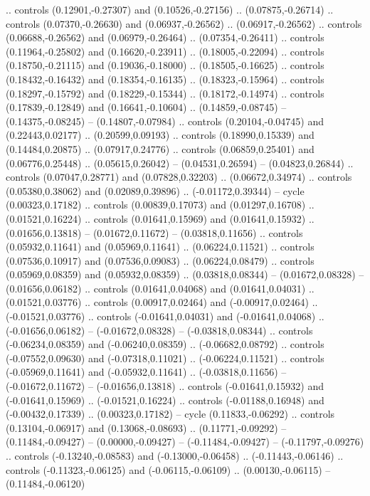 {{.. controls (0.12901,-0.27307) and (0.10526,-0.27156) .. (0.07875,-0.26714)
.. controls (0.07370,-0.26630) and (0.06937,-0.26562) .. (0.06917,-0.26562)
.. controls (0.06688,-0.26562) and (0.06979,-0.26464) .. (0.07354,-0.26411)
.. controls (0.11964,-0.25802) and (0.16620,-0.23911) .. (0.18005,-0.22094)
.. controls (0.18750,-0.21115) and (0.19036,-0.18000) .. (0.18505,-0.16625)
.. controls (0.18432,-0.16432) and (0.18354,-0.16135) .. (0.18323,-0.15964)
.. controls (0.18297,-0.15792) and (0.18229,-0.15344) .. (0.18172,-0.14974)
.. controls (0.17839,-0.12849) and (0.16641,-0.10604) .. (0.14859,-0.08745)
-- (0.14375,-0.08245)
-- (0.14807,-0.07984)
.. controls (0.20104,-0.04745) and (0.22443,0.02177) .. (0.20599,0.09193)
.. controls (0.18990,0.15339) and (0.14484,0.20875) .. (0.07917,0.24776)
.. controls (0.06859,0.25401) and (0.06776,0.25448) .. (0.05615,0.26042)
-- (0.04531,0.26594)
-- (0.04823,0.26844)
.. controls (0.07047,0.28771) and (0.07828,0.32203) .. (0.06672,0.34974)
.. controls (0.05380,0.38062) and (0.02089,0.39896) .. (-0.01172,0.39344)
-- cycle
(0.00323,0.17182)
.. controls (0.00839,0.17073) and (0.01297,0.16708) .. (0.01521,0.16224)
.. controls (0.01641,0.15969) and (0.01641,0.15932) .. (0.01656,0.13818)
-- (0.01672,0.11672)
-- (0.03818,0.11656)
.. controls (0.05932,0.11641) and (0.05969,0.11641) .. (0.06224,0.11521)
.. controls (0.07536,0.10917) and (0.07536,0.09083) .. (0.06224,0.08479)
.. controls (0.05969,0.08359) and (0.05932,0.08359) .. (0.03818,0.08344)
-- (0.01672,0.08328)
-- (0.01656,0.06182)
.. controls (0.01641,0.04068) and (0.01641,0.04031) .. (0.01521,0.03776)
.. controls (0.00917,0.02464) and (-0.00917,0.02464) .. (-0.01521,0.03776)
.. controls (-0.01641,0.04031) and (-0.01641,0.04068) .. (-0.01656,0.06182)
-- (-0.01672,0.08328)
-- (-0.03818,0.08344)
.. controls (-0.06234,0.08359) and (-0.06240,0.08359) .. (-0.06682,0.08792)
.. controls (-0.07552,0.09630) and (-0.07318,0.11021) .. (-0.06224,0.11521)
.. controls (-0.05969,0.11641) and (-0.05932,0.11641) .. (-0.03818,0.11656)
-- (-0.01672,0.11672)
-- (-0.01656,0.13818)
.. controls (-0.01641,0.15932) and (-0.01641,0.15969) .. (-0.01521,0.16224)
.. controls (-0.01188,0.16948) and (-0.00432,0.17339) .. (0.00323,0.17182)
-- cycle
(0.11833,-0.06292)
.. controls (0.13104,-0.06917) and (0.13068,-0.08693) .. (0.11771,-0.09292)
-- (0.11484,-0.09427)
-- (0.00000,-0.09427)
-- (-0.11484,-0.09427)
-- (-0.11797,-0.09276)
.. controls (-0.13240,-0.08583) and (-0.13000,-0.06458) .. (-0.11443,-0.06146)
.. controls (-0.11323,-0.06125) and (-0.06115,-0.06109) .. (0.00130,-0.06115)
-- (0.11484,-0.06120)
}}
